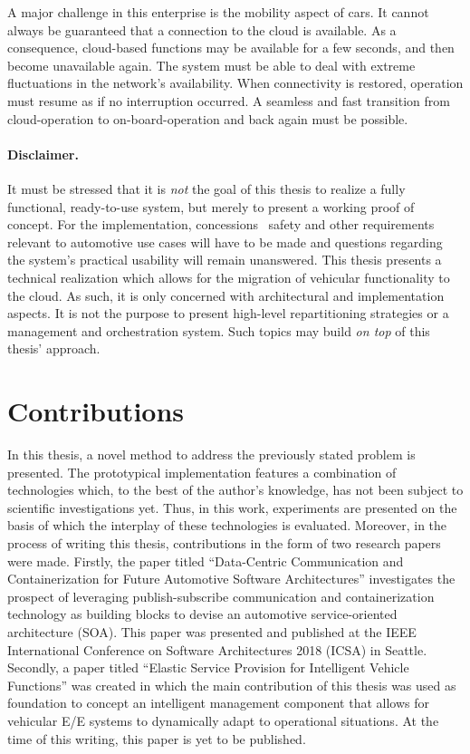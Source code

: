 A major challenge in this enterprise is the mobility aspect of cars. It cannot always be guaranteed that a connection to the cloud is available. As a consequence, cloud-based functions may be available for a few seconds, and then become unavailable again. The system must be able to deal with extreme fluctuations in the network's availability. When connectivity is restored, operation must resume as if no interruption occurred. A seamless and fast transition from cloud-operation to on-board-operation and back again must be possible.

\paragraph{Disclaimer.}
It must be stressed that it is \emph{not} the goal of this thesis to realize a fully functional, ready-to-use system, but merely to present a working proof of concept. For the implementation, concessions \wrt\ safety and other requirements relevant to automotive use cases will have to be made and questions regarding the system's practical usability will remain unanswered. This thesis presents a technical realization which allows for the migration of vehicular functionality to the cloud. As such, it is only concerned with architectural and implementation aspects.
It is not the purpose to present high-level repartitioning strategies or a management and orchestration system. Such topics may build \emph{on top} of this thesis' approach.
%
%
%
%
%
%
%
%
%
%
\section{Contributions}
In this thesis, a novel method to address the previously stated problem is presented. The prototypical implementation features a combination of technologies which, to the best of the author's knowledge, has not been subject to scientific investigations yet. Thus, in this work, experiments are presented on the basis of which the interplay of these technologies is evaluated.
Moreover, in the process of writing this thesis, contributions in the form of two research papers were made.
Firstly, the paper titled ``Data-Centric Communication and Containerization for Future Automotive Software Architectures'' \cite{kugele:hettler:peter:icsa18} investigates the prospect of leveraging publish-subscribe communication and containerization technology as building blocks to devise an automotive service-oriented architecture (SOA). This paper was presented and published at the IEEE International Conference on Software Architectures 2018 (ICSA) in Seattle.
Secondly, a paper titled ``Elastic Service Provision for Intelligent Vehicle Functions'' \cite{kugele:hettler:itsc} was created in which the main contribution of this thesis was used as foundation to concept an intelligent management component that allows for vehicular E/E systems to dynamically adapt to operational situations. At the time of this writing, this paper is yet to be published.
%
%
%
%
%
%
%
%
%
%
